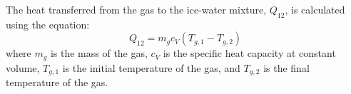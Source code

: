The heat transferred from the gas to the ice-water mixture, \( Q_{12} \), is calculated using the equation:  
\[
Q_{12} = m_g c_V (T_{g,1} - T_{g,2})
\]  
where \( m_g \) is the mass of the gas, \( c_V \) is the specific heat capacity at constant volume, \( T_{g,1} \) is the initial temperature of the gas, and \( T_{g,2} \) is the final temperature of the gas.
